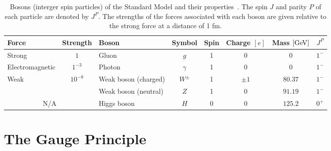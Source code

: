 \begin{table}[h]
	\centering
	\caption{Bosons (interger spin particles) of the Standard Model and their properties~\cite{ParticleDataGroup}.
		The spin $J$ and parity $P$ of each particle are denoted by $J^P$. The strengths of the forces associated with each boson are given relative to the strong force at a distance of 1 \unit{\femto\metre}.}
	\begin{adjustbox}{max width=\textwidth}
		\label{tab:bosons}
		\renewcommand{\arraystretch}{1.5}
		\begin{tabular}{lclccccc}
			\toprule
			\hline
			Force                   & Strength                   & Boson                & Symbol   & Spin & Charge $[e]$ & Mass $[\GeV]$ & $J^P$ \\
			\hline
			Strong                  & $1$                        & Gluon                & $g$      & 1    & 0            & 0             & $1^-$ \\
			Electromagnetic         & $1^{-3}$                   & Photon               & $\gamma$ & 1    & 0            & 0             & $1^-$ \\
			\multirow{2}{*}{Weak}   & \multirow{2}{*}{$10^{-8}$} & Weak boson (charged) & $W^\pm$  & 1    & $\pm 1$      & $80.37$       & $1^-$ \\
			                        &                            & Weak boson (neutral) & $Z$      & 1    & 0            & $91.19$       & $1^-$ \\
			\hline
			\multicolumn{2}{c}{N/A} & Higgs boson                & $H$                  & 0        & 0    & $125.2$      & $0^+$                 \\
			\hline
		\end{tabular}
	\end{adjustbox}
\end{table}

\section{The Gauge Principle}
\label{sec:gauge_principle}

